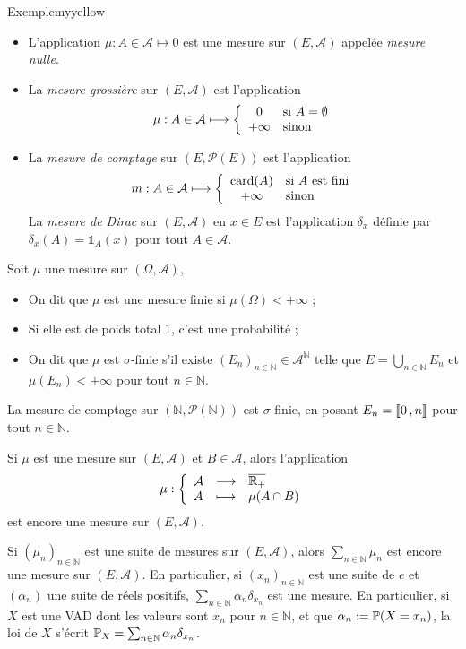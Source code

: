     \begin{omed}{Exemple}{myyellow}
        \begin{itemize}
            \item L’application $\mu : A \in \mathcal{A} \mapsto 0$ est une mesure sur $(E, \mathcal{A})$ appelée \textit{mesure nulle}.
            \item La \textit{mesure grossière} sur $(E, \mathcal{A})$ est l’application 
            \[ \mu : A \in \mathcal{A} \longmapsto \sisinon{0}{A = \emptyset}{+\infty} \]   
            \item La \textit{mesure de comptage} sur $(E, \mathcal{P}(E))$ est l’application 
            \[ m : A \in \mathcal{A} \longmapsto \sisinon{\card(A)}{A \text{ est fini}}{+\infty} \]    
            La \textit{mesure de Dirac} sur $(E,\mathcal{A})$ en $x \in E$ est l’application $\delta_x$ définie par $\delta_x(A) = \mathbb{1}_A(x)$ pour tout $A \in \mathcal{A}$.
        \end{itemize}
    \end{omed}

    \begin{defi}{}{}
        Soit $\mu$ une mesure sur $(\Omega, \mathcal{A})$, 
        \begin{itemize}
            \item On dit que $\mu$ est une mesure finie si $\mu(\Omega) < +\infty$ ;
            \item Si elle est de poids total $1$, c’est une probabilité ;
            \item On dit que $\mu$ est $\sigma$-finie s’il existe $(E_n)_{n \in \mathbb{N}} \in \mathcal{A}^{\mathbb{N}}$ telle que $E = \bigcup_{n \in \mathbb{N}} E_n$ et $\mu(E_n) < +\infty$ pour tout $n \in \mathbb{N}$.
        \end{itemize}
    \end{defi}

    La mesure de comptage sur $(\mathbb{N}, \mathcal{P}(\mathbb{N}))$ est $\sigma$-finie, en posant $E_n = \intervalleEntier{0}{n}$ pour tout $n \in \mathbb{N}$.

    Si $\mu$ est une mesure sur $(E, \mathcal{A})$ et $B \in \mathcal{A}$, alors l’application 
    \[ \fonction{\mu}{\mathcal{A}}{\ovl{\mathbb{R}_+}}{A}{\mu(A \cap B)} \]    
    est encore une mesure sur $(E, \mathcal{A})$. 

    Si $(\mu_n)_{n \in \mathbb{N}}$ est une suite de mesures sur $(E,\mathcal{A})$, alors $\sum_{n \in \mathbb{N}} \mu_n$ est encore une mesure sur $(E,\mathcal{A})$. En particulier, si $(x_n)_{n \in \mathbb{N}}$ est une suite de $e$ et $(\alpha_n)$ une suite de réels positifs, $\sum_{n \in \mathbb{N}} \alpha_n \delta_{x_n}$ est une mesure. En particulier, si $X$ est une VAD dont les valeurs sont $x_n$ pour $n \in \mathbb{N}$, et que $\alpha_n := \P(X = x_n)$, la loi de $X$ s’écrit $\P_X = \sum_{n \in \mathbb{N}} \alpha_n \delta_{x_n}$.

